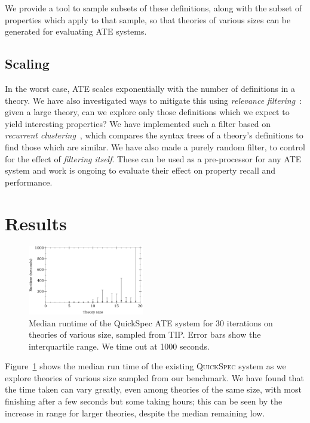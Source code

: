 \documentclass[]{default}
\begin{document}
We provide a tool to sample subsets of these definitions, along with the subset
of properties which apply to that sample, so that theories of various sizes can
be generated for evaluating ATE systems.

\subsection{Scaling}\label{recurrent-clustering}

In the worst case, ATE scales exponentially with the number of definitions in a
theory. We have also investigated ways to mitigate this using \emph{relevance
  filtering}~\cite{meng2009lightweight}: given a large theory, can we explore
only those definitions which we expect to yield interesting properties? We have
implemented such a filter based on
\emph{recurrent clustering}~\cite{journals/corr/abs-1212-3618}, which compares
the syntax trees of a theory's definitions to find those which are similar. We
have also made a purely random filter, to control for the effect of
\emph{filtering itself}. These can be used as a pre-processor for any ATE system
and work is ongoing to evaluate their effect on property recall and performance.

\section{Results}

\begin{figure}
  \centering
  \includegraphics[width=0.45\textwidth]{runtimes}
  \caption{Median runtime of the QuickSpec ATE system for 30 iterations on
    theories of various size, sampled from TIP. Error bars show the
    interquartile range. We time out at 1000 seconds.}\label{fig:runtimes}
\end{figure}

Figure~\ref{fig:runtimes} shows the median run time of the existing
\textsc{QuickSpec}\cite{QuickSpec} system as we explore theories of various size
sampled from our benchmark. We have found that the time taken can vary greatly,
even among theories of the same size, with most finishing after a few seconds
but some taking hours; this can be seen by the increase in range for larger
theories, despite the median remaining low.
\end{document}
